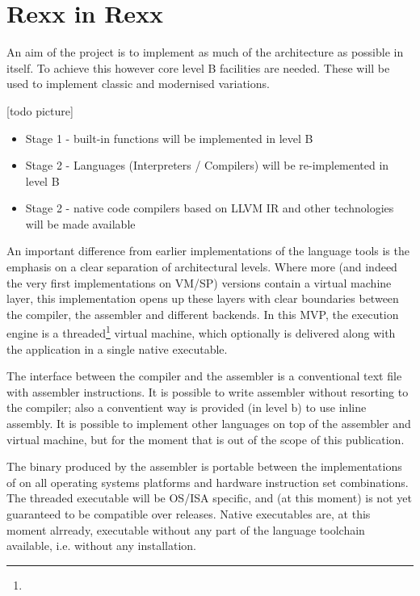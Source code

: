 \section{Rexx in Rexx}
An aim of the project is to implement as much of the \crexx{} architecture as possible in \rexx{} itself. To achieve this however core \rexx{} level B facilities are needed. These will be used to implement classic \rexx{} and modernised \rexx{} variations. 

[todo picture]
\begin{itemize}
\item Stage 1 - \rexx{} built-in functions will be implemented in \crexx{} level B
\item Stage 2 - \rexx{} Languages (Interpreters / Compilers) will be re-implemented in \crexx{} level B
\item Stage 2 - native code compilers based on LLVM IR and other technologies will be made available
\end{itemize}

An important difference from earlier implementations of the language tools is the emphasis on a clear separation of architectural levels. Where more (and indeed the very first implementations on VM/SP) versions contain a virtual machine layer, this implementation opens up these layers with clear boundaries between the compiler, the assembler and different backends. In this MVP, the execution engine is a threaded\footnote{} virtual machine, which optionally is delivered along with the application in a single native executable.

The interface between the compiler and the assembler is a conventional text file with \crexx{} assembler instructions. It is possible to write \crexx{} assembler without resorting to the compiler; also a conventient way is provided (in \crexx{} level b) to use inline assembly. It is possible to implement other languages on top of the assembler and virtual machine, but for the moment that is out of the scope of this publication.

The binary produced by the assembler is portable between the implementations of \crexx{} on all operating systems platforms and hardware instruction set combinations. The threaded executable will be OS/ISA specific, and (at this moment) is not yet guaranteed to be compatible over \crexx{} releases. Native executables are, at this moment alrready, executable without any part of the language toolchain available, i.e. without any installation.

